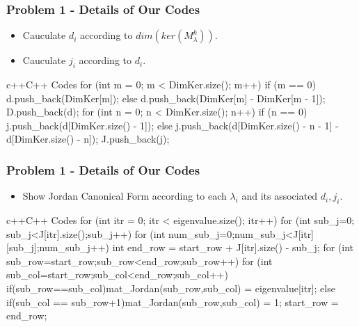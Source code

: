     \begin{frame}[fragile]
        \frametitle{Problem 1 - Details of Our Codes}
        \begin{itemize}
            \item Cauculate \(d_i\) according to \(dim(ker(M_\lambda^k))\).
            \item Cauculate \(j_i\) according to \(d_i\).
        \end{itemize}
        \begin{codeblock}{c++}{C++ Codes}
    for (int m = 0; m < DimKer.size(); m++) {
        if (m == 0) { d.push_back(DimKer[m]); }
        else { d.push_back(DimKer[m] - DimKer[m - 1]);}}
    D.push_back(d); 
    for (int n = 0; n < DimKer.size(); n++) {
        if (n == 0) { j.push_back(d[DimKer.size() - 1]); }
        else { j.push_back(d[DimKer.size() - n - 1] - d[DimKer.size() - n]); }}
    J.push_back(j);
        \end{codeblock}
    \end{frame}

    \begin{frame}[fragile]
        \frametitle{Problem 1 - Details of Our Codes}
        \begin{itemize}
            \item Show Jordan Canonical Form according to each \(\lambda_i\) and its associated \(d_i,j_i\).
        \end{itemize}
        \begin{codeblock}{c++}{C++ Codes}
for (int itr = 0; itr < eigenvalue.size(); itr++){
    for (int sub_j=0; sub_j<J[itr].size();sub_j++){
        for (int num_sub_j=0;num_sub_j<J[itr][sub_j];num_sub_j++){
            int end_row = start_row + J[itr].size() - sub_j;
            for (int sub_row=start_row;sub_row<end_row;sub_row++){
                for (int sub_col=start_row;sub_col<end_row;sub_col++){
                    if(sub_row==sub_col){mat_Jordan(sub_row,sub_col) = eigenvalue[itr];}
                    else if(sub_col == sub_row+1){mat_Jordan(sub_row,sub_col) = 1;}}} 
                start_row = end_row;}}}
        \end{codeblock}
    \end{frame}

